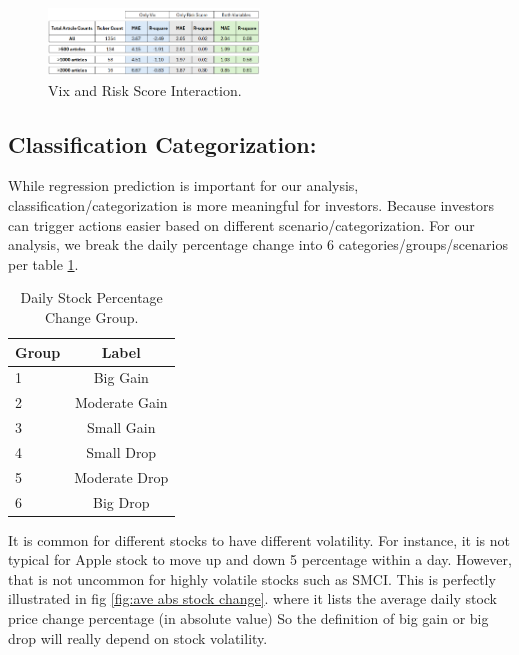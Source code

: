\documentclass[twocolumn]{article}
\begin{document}
\begin{figure}[ht]
    \centering
    \includegraphics[width=0.5\textwidth]{vix and risk score interaction table.png}
    \caption{Vix and Risk Score Interaction.}
    \label{fig:vix and risk score}
\end{figure}

\subsection{Classification Categorization:}
While regression prediction is important for our analysis, classification/categorization is more meaningful for investors. Because investors can trigger actions easier based on different scenario/categorization. For our analysis, we break the daily percentage change into 6 categories/groups/scenarios per table \ref{tab:Daily Stock Percetage change Categories.}.

\begin{table}[h!]
\centering
\normalsize
\begin{tabular}{|l|c|}
\hline
\textbf{Group} & \textbf{Label} \\
\hline
1 & Big Gain \\
2 & Moderate Gain \\
3 & Small Gain \\
4 & Small Drop \\
5 & Moderate Drop \\
6 & Big Drop \\

\hline
\end{tabular}
\caption{Daily Stock Percentage Change Group.}
\label{tab:Daily Stock Percetage change Categories.}
\end{table}

It is common for different stocks to have different volatility. For instance, it is not typical for Apple stock to move up and down 5 percentage within a day. However, that is not uncommon for highly volatile stocks such as SMCI. This is perfectly illustrated in fig \ref{fig:ave abs stock change}.  where it lists the average daily stock price change percentage (in absolute value) So the definition of big gain or big drop will really depend on stock volatility.    
\end{document}
